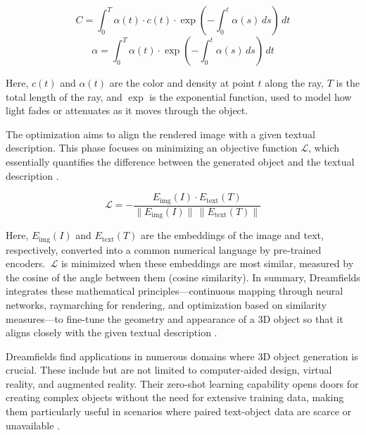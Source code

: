 \[
C = \int_0^T \alpha(t) \cdot c(t) \cdot \exp\left(-\int_0^t \alpha(s) \, ds\right) \, dt
\]
\[
\alpha = \int_0^T \alpha(t) \cdot \exp\left(-\int_0^t \alpha(s) \, ds\right) \, dt
\]

Here, \( c(t) \) and \( \alpha(t) \) are the color and density at point \( t \) along the ray, \( T \) is the total length of the ray, and \( \exp \) is the exponential function, used to model how light fades or attenuates as it moves through the object. 

The optimization aims to align the rendered image with a given textual description. This phase focuses on minimizing an objective function \( \mathcal{L} \), which essentially quantifies the difference between the generated object and the textual description \citep{jainDreamFields}.

\[
\mathcal{L} = -\frac{E_{\text{img}}(I) \cdot E_{\text{text}}(T)}{\| E_{\text{img}}(I) \| \, \| E_{\text{text}}(T) \|}
\]

Here, \( E_{\text{img}}(I) \) and \( E_{\text{text}}(T) \) are the embeddings of the image and text, respectively, converted into a common numerical language by pre-trained encoders.~\( \mathcal{L} \) is minimized when these embeddings are most similar, measured by the cosine of the angle between them (cosine similarity). In summary, Dreamfields integrates these mathematical principles—continuous mapping through neural networks, raymarching for rendering, and optimization based on similarity measures—to fine-tune the geometry and appearance of a 3D object so that it aligns closely with the given textual description \citep{jainDreamFields}.

Dreamfields find applications in numerous domains where 3D object generation is crucial. These include but are not limited to computer-aided design, virtual reality, and augmented reality. Their zero-shot learning capability opens doors for creating complex objects without the need for extensive training data, making them particularly useful in scenarios where paired text-object data are scarce or unavailable \citep{jainDreamFields}.

